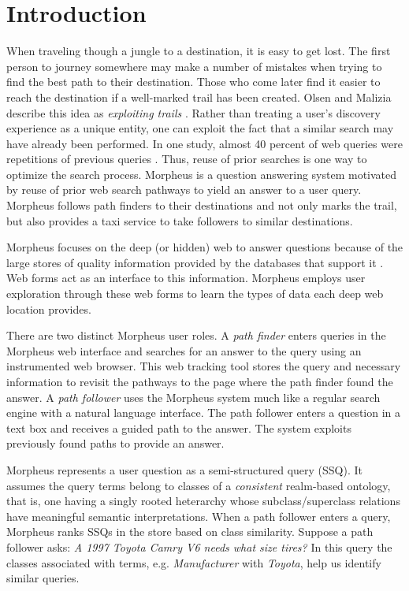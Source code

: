 \section{Introduction}



When traveling though a jungle to a destination, it is easy to get lost.  The first person to journey somewhere may make a number of mistakes when trying to find the best path to their destination. Those who come later find it easier to reach the destination if a well-marked trail has been created. Olsen and Malizia describe this idea as \emph{exploiting trails} \cite{5379671}.  Rather than treating a user's discovery experience as a unique entity, one can exploit the fact that a similar search may have already been performed.  In one study, almost 40 percent of web queries were repetitions of previous queries \cite{1277770}. Thus, reuse of prior searches is one way to optimize the search process.  Morpheus is a question answering system motivated by reuse of prior web search pathways to yield an answer to a user query. Morpheus follows path finders to their destinations and not only marks the trail, but also provides a taxi service to take followers to similar destinations.  

Morpheus focuses on the deep (or hidden) web to answer questions because of the large stores of quality information provided by the databases that support it \cite{1453931}.  Web forms act as an interface to this information.  Morpheus employs user exploration through these web forms to learn the types of data each deep web location provides.

There are two distinct Morpheus user roles. A \emph{path finder} enters queries in the Morpheus web interface and searches for an answer to the query using an instrumented web browser. This web tracking tool stores the query and necessary information to revisit the pathways to the page where the path finder found the answer. A \emph{path follower} uses the Morpheus system much like a regular search engine with a natural language interface. The path follower enters a question in a text box and receives a guided path to the answer. The system exploits previously found paths to provide an answer.

Morpheus represents a user question as a semi-structured query (SSQ). It assumes the query terms belong to classes of a \emph{consistent} realm-based ontology, that is, one having a singly rooted heterarchy whose subclass/superclass relations have meaningful semantic interpretations. When a path follower enters a query, Morpheus ranks SSQs in the store based on class similarity. Suppose a path follower asks: \emph{ A 1997 Toyota Camry V6 needs what size tires?} In this query the classes associated with terms, e.g. \emph{Manufacturer} with \emph{Toyota}, help us identify similar queries.

